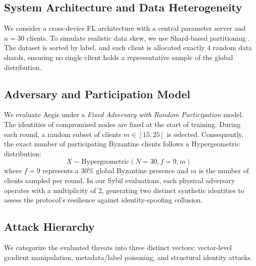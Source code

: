 \documentclass[10pt, conference]{IEEEtran}
\begin{document}
\subsection{System Architecture and Data Heterogeneity}
We consider a cross-device FL architecture with a central parameter server and $n = 30$ clients. To simulate realistic data skew, we use Shard-based partitioning \cite{mcmahan2017}. The dataset is sorted by label, and each client is allocated exactly 4 random data shards, ensuring no single client holds a representative sample of the global distribution.

\subsection{Adversary and Participation Model}
We evaluate Aegis under a \textit{Fixed Adversary with Random Participation} model. The identities of compromised nodes are fixed at the start of training. During each round, a random subset of clients $m \in [15, 25]$ is selected. Consequently, the exact number of participating Byzantine clients follows a Hypergeometric distribution:
\begin{equation}
X \sim \text{Hypergeometric}(N=30, f=9, m)
\end{equation}
where $f=9$ represents a 30\% global Byzantine presence and $m$ is the number of clients sampled per round. In our Sybil evaluations, each physical adversary operates with a multiplicity of 2, generating two distinct synthetic identities to assess the protocol's resilience against identity-spoofing collusion.

\subsection{Attack Hierarchy}
We categorize the evaluated threats into three distinct vectors: vector-level gradient manipulation, metadata/label poisoning, and structural identity attacks.
\end{document}
